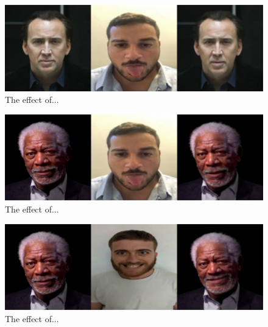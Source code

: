 \documentclass[english,12pt]{article}
\begin{document}
\begin{figure}[htb]
  \begin{centering}
      \includegraphics[scale=0.29]{images/‏‏Amit_tongue_cage.PNG}
  \par\end{centering}
  \caption{\label{fig:Amit_tongue_cage}The effect of...}
\end{figure}

\begin{figure}[htb]
  \begin{centering}
      \includegraphics[scale=0.29]{images/‏‏Amit_tongue_freeman.PNG}
  \par\end{centering}
  \caption{\label{fig:Amit_tongue_freeman}The effect of...}
\end{figure}

\begin{figure}[htb]
  \begin{centering}
      \includegraphics[scale=0.29]{images/Oren_smile_freeman.PNG}
  \par\end{centering}
  \caption{\label{fig:Oren_smile_freeman}The effect of...}
\end{figure}
\end{document}
